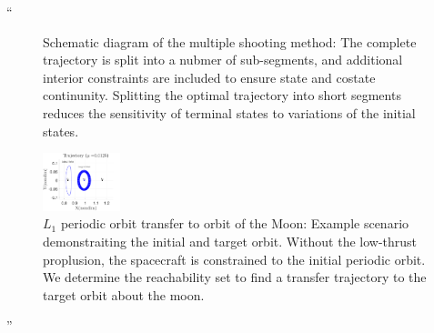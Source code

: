 \documentclass[11pt]{article}
\newenvironment{correction}{\begin{list}{}{\setlength{\leftmargin}{1cm}\setlength{\rightmargin}{1cm}}\vspace{\parsep}\item[]``}{''\end{list}}
\begin{document}
\begin{enumerate}
\begin{correction}
\begin{figure}[H]
\begin{scaletikzpicturetowidth}{0.7\textwidth}
        \end{scaletikzpicturetowidth}
        \caption{Schematic diagram of the multiple shooting method:
        The complete trajectory is split into a nubmer of sub-segments, and additional interior constraints are included to ensure state and costate continunity.
    Splitting the optimal trajectory into short segments reduces the sensitivity of terminal states to variations of the initial states.}
\end{figure}

\begin{figure}[H]
   \centering
   \includegraphics[width=0.2\textwidth]{moon_orbit} %
   \caption{\(L_1\) periodic orbit transfer to orbit of the Moon: Example scenario demonstraiting the initial and target orbit.
   Without the low-thrust proplusion, the spacecraft is constrained to the initial periodic orbit. 
   We determine the reachability set to find a transfer trajectory to the target orbit about the moon.}
\end{figure}


\end{correction}
\end{enumerate}
\end{document}
